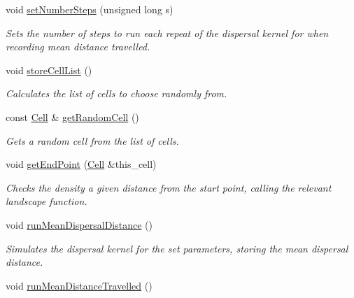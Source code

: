 \begin{DoxyCompactItemize}
void \hyperlink{class_simulate_dispersal_a4a38f61284426daa4d968bbab91d3608}{set\+Number\+Steps} (unsigned long s)
\begin{DoxyCompactList}\small\item\em Sets the number of steps to run each repeat of the dispersal kernel for when recording mean distance travelled. \end{DoxyCompactList}\item 
void \hyperlink{class_simulate_dispersal_a85d8ee68e5f4962429571c835aa028b4}{store\+Cell\+List} ()\hypertarget{class_simulate_dispersal_a85d8ee68e5f4962429571c835aa028b4}{}\label{class_simulate_dispersal_a85d8ee68e5f4962429571c835aa028b4}

\begin{DoxyCompactList}\small\item\em Calculates the list of cells to choose randomly from. \end{DoxyCompactList}\item 
const \hyperlink{struct_cell}{Cell} \& \hyperlink{class_simulate_dispersal_a7d0a2b28dd8d45f1b8a74dbcd82290e7}{get\+Random\+Cell} ()
\begin{DoxyCompactList}\small\item\em Gets a random cell from the list of cells. \end{DoxyCompactList}\item 
void \hyperlink{class_simulate_dispersal_a5069adc35fba116716bebd288dd9e65f}{get\+End\+Point} (\hyperlink{struct_cell}{Cell} \&this\+\_\+cell)
\begin{DoxyCompactList}\small\item\em Checks the density a given distance from the start point, calling the relevant landscape function. \end{DoxyCompactList}\item 
void \hyperlink{class_simulate_dispersal_a4a759f6bb3b8288345eaf7c0d66ad29e}{run\+Mean\+Dispersal\+Distance} ()\hypertarget{class_simulate_dispersal_a4a759f6bb3b8288345eaf7c0d66ad29e}{}\label{class_simulate_dispersal_a4a759f6bb3b8288345eaf7c0d66ad29e}

\begin{DoxyCompactList}\small\item\em Simulates the dispersal kernel for the set parameters, storing the mean dispersal distance. \end{DoxyCompactList}\item 
void \hyperlink{class_simulate_dispersal_a406514e917874907cfb7a8d6c7889098}{run\+Mean\+Distance\+Travelled} ()\hypertarget{class_simulate_dispersal_a406514e917874907cfb7a8d6c7889098}{}\label{class_simulate_dispersal_a406514e917874907cfb7a8d6c7889098}


\end{DoxyCompactItemize}

